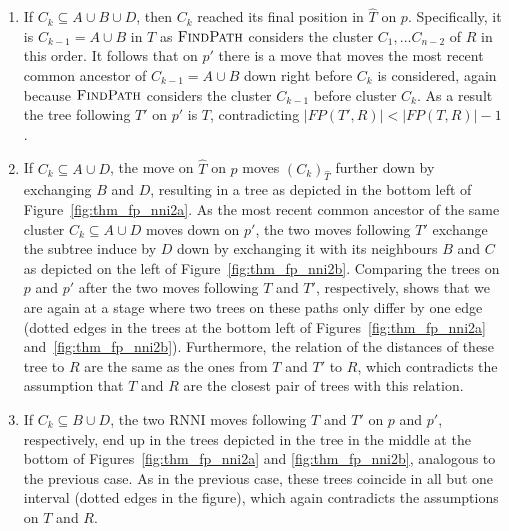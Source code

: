 \documentclass{amsart}
\newcommand{\rnni}{\mathrm{RNNI}}
\newcommand{\findpath}{\textsc{FindPath}}
\begin{document}
\begin{enumerate}
    \begin{enumerate}
        \item
        If $C_k \subseteq A \cup B \cup D$, then $C_k$ reached its final position in $\hat T$ on $p$.
            Specifically, it is $C_{k-1} = A \cup B$ in $T$ as $\findpath$ considers the cluster $C_1,\ldots C_{n-2}$ of $R$ in this order.
            It follows that on $p'$ there is a move that moves the most recent common ancestor of $C_{k-1} = A \cup B$ down right before $C_k$ is considered, again because $\findpath$ considers the cluster $C_{k-1}$ before cluster $C_k$.
            As a result the tree following $T'$ on $p'$ is $T$, contradicting $|FP(T',R)| < |FP(T,R)| - 1$.
        \item
            If $C_k \subseteq A \cup D$, the move on $\hat T$ on $p$ moves $(C_k)_{\hat T}$ further down by exchanging $B$ and $D$, resulting in a tree as depicted in the bottom left of Figure~\ref{fig:thm_fp_nni2a}.
            As the most recent common ancestor of the same cluster $C_k \subseteq A \cup D$ moves down on $p'$, the two moves following $T'$ exchange the subtree induce by $D$ down by exchanging it with its neighbours $B$ and $C$ as depicted on the left of Figure~\ref{fig:thm_fp_nni2b}.
            Comparing the trees on $p$ and $p'$ after the two moves following $T$ and $T'$, respectively, shows that we are again at a stage where two trees on these paths only differ by one edge (dotted edges in the trees at the bottom left of Figures~\ref{fig:thm_fp_nni2a} and~\ref{fig:thm_fp_nni2b}).
            Furthermore, the relation of the distances of these tree to $R$ are the same as the ones from $T$ and $T'$ to $R$, which contradicts the assumption that $T$ and $R$ are the closest pair of trees with this relation.
        \item
            If $C_k \subseteq B \cup D$, the two $\rnni$ moves following $T$ and $T'$ on $p$ and $p'$, respectively, end up in the trees depicted in the tree in the middle at the bottom of Figures~\ref{fig:thm_fp_nni2a} and \ref{fig:thm_fp_nni2b}, analogous to the previous case.
            As in the previous case, these trees coincide in all but one interval (dotted edges in the figure), which again contradicts the assumptions on $T$ and $R$.
    \end{enumerate}


\end{enumerate}
\end{document}
